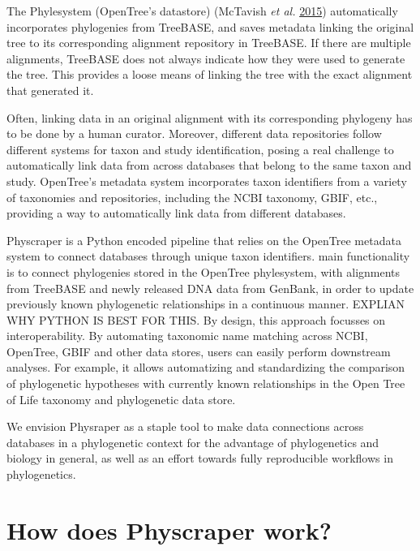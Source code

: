 \documentclass[]{article}
\begin{document}
The Phylesystem (OpenTree's datastore) (McTavish \emph{et al.} \protect\hyperlink{ref-mctavish2015phylesystem}{2015}) automatically incorporates phylogenies from TreeBASE, and saves metadata linking the original tree to its corresponding alignment repository in TreeBASE. If there are multiple alignments, TreeBASE does not always indicate how they were used to generate the tree. This provides a loose means of linking the tree with the exact alignment that generated it.

Often, linking data in an original alignment with its corresponding phylogeny has to be done by a human curator.
Moreover, different data repositories follow different systems for taxon and study identification, posing a real challenge to automatically link data from across databases that belong to the same taxon and study.
OpenTree's metadata system incorporates taxon identifiers from a variety of taxonomies and repositories, including the NCBI taxonomy, GBIF, etc., providing a way to automatically link data from different databases.

Physcraper is a Python encoded pipeline that relies on the OpenTree metadata system to connect databases through unique taxon identifiers.
main functionality is to connect phylogenies stored in the OpenTree phylesystem, with alignments from TreeBASE and newly released DNA data from GenBank, in order to update previously known phylogenetic relationships in a continuous manner.
EXPLIAN WHY PYTHON IS BEST FOR THIS.
By design, this approach focusses on interoperability. By automating taxonomic name matching across NCBI, OpenTree, GBIF and other data stores, users can easily perform downstream analyses.
For example, it allows automatizing and standardizing the comparison of phylogenetic hypotheses with currently known relationships in the Open Tree of Life taxonomy and phylogenetic data store.

We envision Physraper as a staple tool to make data connections across databases in a phylogenetic context for the advantage of phylogenetics and biology in general, as well as an effort towards fully reproducible workflows in phylogenetics.

\hypertarget{how-does-physcraper-work}{%
\section{How does Physcraper work?}\label{how-does-physcraper-work}}
\end{document}
